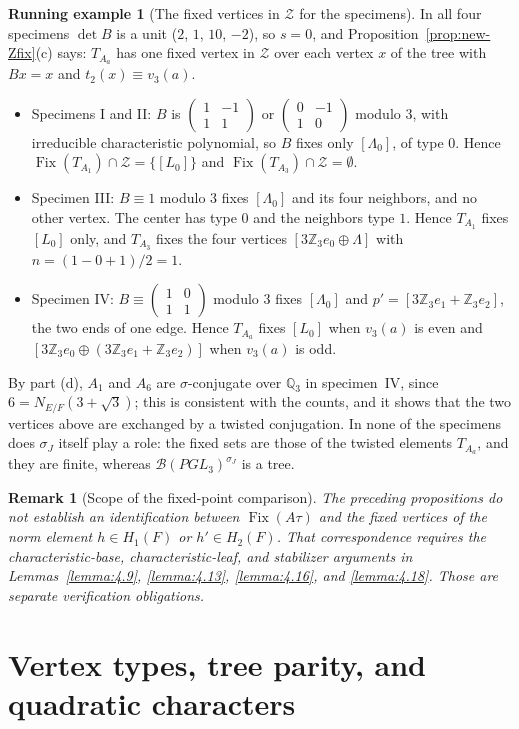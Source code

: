 \documentclass[12pt,letterpaper]{amsart}
\numberwithin{equation}{section}
\newtheorem{draftremark}{Remark}
\theoremstyle{definition}
\newtheorem{runex}[theorem]{Running example}
\theoremstyle{plain}
\newcommand{\smat}[4]{\left(\begin{smallmatrix}#1&#2\\#3&#4\end{smallmatrix}\right)}
\begin{document}
\begin{runex}[The fixed vertices in $\mathcal Z$ for the specimens]
\label{run:Zfix}
In all four specimens $\det B$ is a unit ($2$, $1$, $10$, $-2$), so
$s=0$, and Proposition~\ref{prop:new-Zfix}(c) says: $T_{A_a}$ has one
fixed vertex in $\mathcal Z$ over each vertex $x$ of the tree with
$Bx=x$ and $t_2(x)\equiv v_3(a)$.
\begin{itemize}
\item Specimens I and II: $B$ is $\smat{1}{-1}{1}{1}$ or
$\smat{0}{-1}{1}{0}$ modulo $3$, with irreducible characteristic
polynomial, so $B$ fixes only $[\Lambda_0]$, of type $0$. Hence
$\operatorname{Fix}(T_{A_1})\cap\mathcal Z=\{[L_0]\}$ and
$\operatorname{Fix}(T_{A_3})\cap\mathcal Z=\emptyset$.
\item Specimen III: $B\equiv1$ modulo $3$ fixes $[\Lambda_0]$ and its
four neighbors, and no other vertex. The center has type $0$ and the
neighbors type $1$. Hence $T_{A_1}$ fixes $[L_0]$ only, and $T_{A_3}$
fixes the four vertices $[3\mathbb Z_3e_0\oplus\Lambda]$ with
$n=(1-0+1)/2=1$.
\item Specimen IV: $B\equiv\smat{1}{0}{1}{1}$ modulo $3$ fixes
$[\Lambda_0]$ and $p'=[3\mathbb Z_3e_1+\mathbb Z_3e_2]$, the two ends
of one edge. Hence $T_{A_a}$ fixes $[L_0]$ when $v_3(a)$ is even and
$[3\mathbb Z_3e_0\oplus(3\mathbb Z_3e_1+\mathbb Z_3e_2)]$ when
$v_3(a)$ is odd.
\end{itemize}
By part (d), $A_1$ and $A_6$ are $\sigma$-conjugate over
$\mathbb Q_3$ in specimen~IV, since $6=N_{E/F}(3+\sqrt3)$; this is
consistent with the counts, and it shows that the two vertices above
are exchanged by a twisted conjugation. In none of the specimens does
$\sigma_J$ itself play a role: the fixed sets are those of the
twisted elements $T_{A_a}$, and they are finite, whereas
$\mathcal B(PGL_3)^{\sigma_J}$ is a tree.
\end{runex}

\begin{draftremark}[Scope of the fixed-point comparison]
The preceding propositions do not establish an identification
between $\operatorname{Fix}(A\tau)$ and the fixed vertices of the
norm element $h\in H_1(F)$ or $h'\in H_2(F)$. That correspondence
requires the characteristic-base, characteristic-leaf, and
stabilizer arguments in Lemmas~\ref{lemma:4.9}, \ref{lemma:4.13},
\ref{lemma:4.16}, and \ref{lemma:4.18}. Those are separate
verification obligations.
\end{draftremark}

\section{Vertex types, tree parity, and quadratic characters}
\label{sec:new-types}
\end{document}
